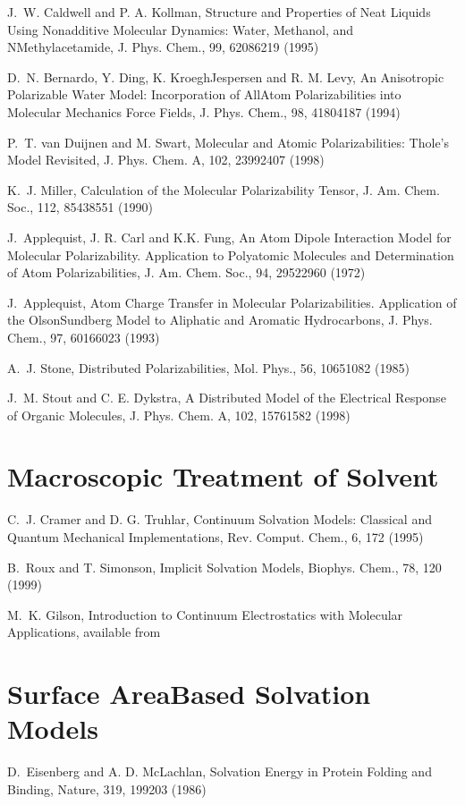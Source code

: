 \documentclass[letterpaper,11pt,english]{sphinxmanual}
\begin{document}
J. W. Caldwell and P. A. Kollman, Structure and Properties of Neat Liquids Using Nonadditive Molecular Dynamics: Water, Methanol, and N\sphinxhyphen{}Methylacetamide, J. Phys. Chem., 99, 6208\sphinxhyphen{}6219 (1995)

D. N. Bernardo, Y. Ding, K. Kroegh\sphinxhyphen{}Jespersen and R. M. Levy, An Anisotropic Polarizable Water Model: Incorporation of All\sphinxhyphen{}Atom Polarizabilities into Molecular Mechanics Force Fields, J. Phys. Chem., 98, 4180\sphinxhyphen{}4187 (1994)

P. T. van Duijnen and M. Swart, Molecular and Atomic Polarizabilities: Thole’s Model Revisited, J. Phys. Chem. A, 102, 2399\sphinxhyphen{}2407 (1998)

K. J. Miller, Calculation of the Molecular Polarizability Tensor, J. Am. Chem. Soc., 112, 8543\sphinxhyphen{}8551 (1990)

J. Applequist, J. R. Carl and K.\sphinxhyphen{}K. Fung, An Atom Dipole Interaction Model for Molecular Polarizability. Application to Polyatomic Molecules and Determination of Atom Polarizabilities, J. Am. Chem. Soc., 94, 2952\sphinxhyphen{}2960 (1972)

J. Applequist, Atom Charge Transfer in Molecular Polarizabilities. Application of the Olson\sphinxhyphen{}Sundberg Model to Aliphatic and Aromatic Hydrocarbons, J. Phys. Chem., 97, 6016\sphinxhyphen{}6023 (1993)

A. J. Stone, Distributed Polarizabilities, Mol. Phys., 56, 1065\sphinxhyphen{}1082 (1985)

J. M. Stout and C. E. Dykstra, A Distributed Model of the Electrical Response of Organic Molecules, J. Phys. Chem. A, 102, 1576\sphinxhyphen{}1582 (1998)


\section{Macroscopic Treatment of Solvent}
\label{\detokenize{text/references:macroscopic-treatment-of-solvent}}
C. J. Cramer and D. G. Truhlar, Continuum Solvation Models: Classical and Quantum Mechanical Implementations, Rev. Comput. Chem., 6, 1\sphinxhyphen{}72 (1995)

B. Roux and T. Simonson, Implicit Solvation Models, Biophys. Chem., 78, 1\sphinxhyphen{}20 (1999)

M. K. Gilson, Introduction to Continuum Electrostatics with Molecular Applications, available from 


\section{Surface Area\sphinxhyphen{}Based Solvation Models}
\label{\detokenize{text/references:surface-area-based-solvation-models}}
D. Eisenberg and A. D. McLachlan, Solvation Energy in Protein Folding and Binding, Nature, 319, 199\sphinxhyphen{}203 (1986)
\end{document}
